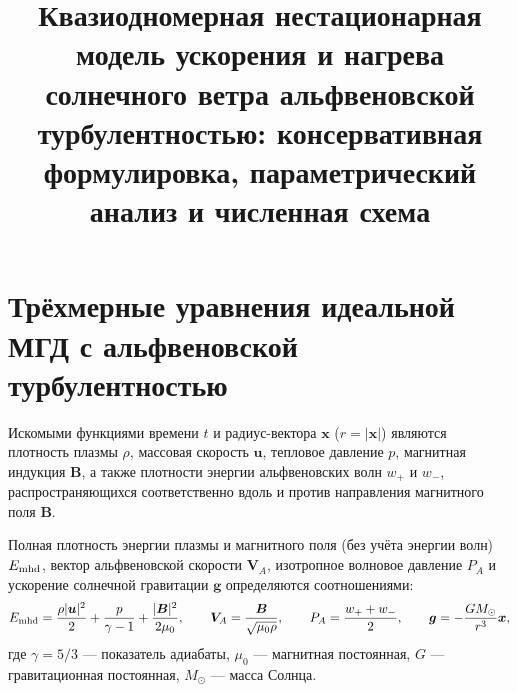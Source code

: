 \documentclass[11pt,a4paper]{article}
\title{\textbf{Квазиодномерная нестационарная модель ускорения и нагрева солнечного ветра альфвеновской турбулентностью: консервативная формулировка, параметрический анализ и численная схема}}
\author{}
\date{}
\begin{document}
\maketitle

\section{Трёхмерные уравнения идеальной МГД с альфвеновской турбулентностью}

Искомыми функциями времени $t$ и радиус-вектора $\bm{x}$ ($r = |\bm{x}|$) являются плотность плазмы $\rho$, массовая скорость $\bm{u}$, тепловое давление $p$, магнитная индукция $\bm{B}$, а также плотности энергии альфвеновских волн $w_+$ и $w_-$, распространяющихся соответственно вдоль и против направления магнитного поля $\bm{B}$.

Полная плотность энергии плазмы и магнитного поля (без учёта энергии волн) $E_{\rm mhd}$, вектор альфвеновской скорости $\bm{V}_A$, изотропное волновое давление $P_A$ и ускорение солнечной гравитации $\bm{g}$ определяются соотношениями:
\begin{equation}
E_{\rm mhd} = \frac{\rho|\bm{u}|^2}{2} + \frac{p}{\gamma-1} + \frac{|\bm{B}|^2}{2\mu_0}, \qquad
\bm{V}_A = \frac{\bm{B}}{\sqrt{\mu_0\rho}}, \qquad
P_A = \frac{w_+ + w_-}{2}, \qquad
\bm{g} = -\frac{GM_\odot}{r^3}\bm{x},
\label{eq:defs_3d}
\end{equation}
где $\gamma = 5/3$ --- показатель адиабаты, $\mu_0$ --- магнитная постоянная, $G$ --- гравитационная постоянная, $M_\odot$ --- масса Солнца.
\end{document}
